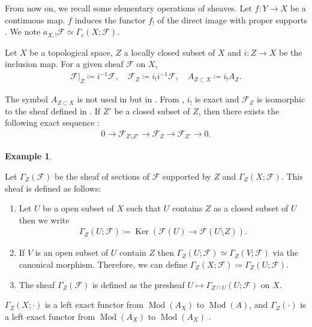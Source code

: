 \documentclass[a4paper,dvipdfmx,reqno,12pt]{amsart}
\theoremstyle{definition}
\newtheorem{Eg}[Thm]{Example}
\newcommand{\deq}{\coloneqq}
\newcommand{\mcal}[1]{\mathcal{#1}}%
\newcommand{\opn}[1]{\operatorname{#1}}
\numberwithin{equation}{section}
\begin{document}
From now on, we recall some elementary 
operations of sheaves. 
Let $f\colon Y\to X$ be a continuous map.
$f$ induces the functor $f_!$ of
the direct image with proper supports 
\cite[(2.5.1)]{MR1299726}. 
We note $a_{X,!}\mathcal{F}\simeq \Gamma_c(X;\mathcal{F})$.

Let $X$ be a topological space, $Z$ a locally closed 
subset of $X$
and $i\colon Z\to X$ be the inclusion map.
For a given sheaf $\mathcal{F}$ on $X$, 
\begin{align}
\mcal{F}|_{Z}\deq i^{-1}\mcal{F}, \quad 
\mcal{F}_Z\deq i_! i^{-1}\mcal{F}, \quad 
A_{Z\subset X}\deq i_! A_Z.
\end{align}

 
The symbol $A_{Z\subset X}$ is not used in \cite{MR1299726} 
but in \cite{MR932640}.
From \cite[Proposition 2.5.4]{MR1299726}, $i_!$ is exact 
and $\mcal{F}_Z$ is isomorphic to the sheaf defined in
\cite[p.93]{MR1299726}.
If $Z'$ be a closed subset of $Z$, then
there exists the following exact sequence 
\cite[Proposition 2.3.6.(v)]{MR1299726}:
\begin{align}
0\to \mathcal{F}_{Z\setminus Z'} \to 
\mathcal{F}_Z \to \mathcal{F}_{Z'}\to 0.
\end{align}

\begin{Eg}

\end{Eg}

Let $\Gamma_{Z}(\mcal{F})$ be the sheaf of sections of 
$\mcal{F}$ supported by $Z$
\cite[Definition 2.3.8]{MR1299726} and 
$\Gamma_{Z}(X;\mcal{F})$. This sheaf is defined as follows:

\begin{enumerate}
\item Let $U$ be a open subset of $X$ such that $U$ contains
$Z$ as a closed subset of $U$ then we write
\begin{align}
  \Gamma_Z(U;\mcal{F})\deq \opn{Ker}(\mcal{F}(U) \to 
\mcal{F}(U\setminus Z)).
\end{align}
\item If $V$ is an open subset of $U$ contain $Z$ then
$\Gamma_{Z}(U;\mcal{F})\simeq \Gamma_{Z}(V;\mcal{F})$
via the canonical morphism. Therefore, we can define
$\Gamma_{Z}(X;\mcal{F})\deq \Gamma_{Z}(U;\mcal{F})$.
\item The sheaf $\Gamma_{Z}(\mcal{F})$ is defined as the presheaf 
$U\mapsto \Gamma_{Z\cap U}(U;\mcal{F})$ on $X$.
\end{enumerate}

$\Gamma_Z(X;\cdot)$ is a left exact functor from 
$\opn{Mod}(A_X)$ to $\opn{Mod}(A)$,
and $\Gamma_{Z}(\cdot)$ is a left exact functor from
$\opn{Mod}(A_X)$ to $\opn{Mod}(A_X)$ 
\cite[Proposition 2.3.9 (i)]{MR1299726}.
\end{document}
